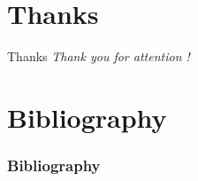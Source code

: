 \documentclass[pdflatex,compress,8pt,
	xcolor={dvipsnames,dvipsnames,svgnames,x11names,table},
	hyperref={
	breaklinks = true, 
	pdfauthor={Lemenkova Polina}, 
	pdfsubject={Preentation}, 
	pdfcreator={Lemenkova Polina}, 
	pdfproducer={Lemenkova Polina}, 
	colorlinks=true,linkcolor=blue, 
	citecolor=NavyBlue, 
	urlcolor = NavyBlue, 
	breaklinks = true}]{beamer}
\begin{document}
\section{Thanks}
\begin{frame}{Thanks}
  	\centering \LARGE 
  	\emph{Thank you for attention !}\\
\end{frame}




\section{Bibliography}
\begin{frame}[allowframebreaks]\frametitle{Bibliography}
	\nocite{*}
	\printbibliography[heading=none]
\end{frame}


\end{document}
